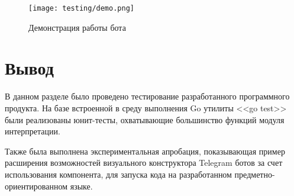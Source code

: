 \begin{figure}[!ht]
	\centering
	\texttt{[image: testing/demo.png]}
	\caption{Демонстрация работы бота}
	\label{f:experimentDemo}
\end{figure}

\section*{Вывод}
В данном разделе было проведено тестирование разработанного программного продукта.
На базе встроенной в среду выполнения Go утилиты <<go test>> были реализованы юнит-тесты, охватывающие большинство функций модуля интерпретации.

Также была выполнена экспериментальная апробация, показывающая пример расширения возможностей визуального конструктора Telegram ботов
за счет использования компонента, для запуска кода на разработанном предметно-ориентированном языке.
\clearpage

